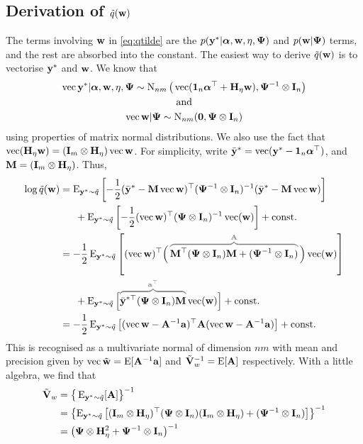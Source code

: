 \subsection{Derivation of \texorpdfstring{$\tilde q({\mathbf w})$}{$\tilde q(w)$}}
\label{apx:qw}

The terms involving ${\mathbf w}$ in \cref{eq:qtilde} are the $p({\mathbf y}^*|{\bm\alpha},{\mathbf w},\eta,{\bm\Psi})$ and $p({\mathbf w}|{\bm\Psi})$ terms, and the rest are absorbed into the constant.
The easiest way to derive $\tilde q({\mathbf w})$ is to vectorise ${\mathbf y}^*$ and ${\mathbf w}$.
We know that
\begin{gather*}
  \operatorname{vec} {\mathbf y}^* |  {\bm\alpha},{\mathbf w},\eta,{\bm\Psi} \sim \operatorname{N}_{nm}\big(\operatorname{vec} ({\mathbf 1}_n{\bm\alpha}^\top + {\mathbf H}_\eta{\mathbf w}), {\bm\Psi}^{-1}\otimes{\mathbf I}_n\big) \\
  \text{and}\\
  \operatorname{vec} {\mathbf w} | {\bm\Psi} \sim \operatorname{N}_{nm} ({\mathbf 0}, {\bm\Psi}\otimes{\mathbf I}_n)
\end{gather*}
using properties of matrix normal distributions.
We also use the fact that $\operatorname{vec} ({\mathbf H}_\eta{\mathbf w}) = ({\mathbf I}_m \otimes {\mathbf H}_\eta)\operatorname{vec}{\mathbf w}$.  %
For simplicity, write $\bar{{\mathbf y}}^* = \operatorname{vec}({\mathbf y}^* - {\mathbf 1}_n{\bm\alpha}^\top)$, and ${\mathbf M} = ({\mathbf I}_m \otimes {\mathbf H}_\eta)$.
Thus,
\begin{align*}
  \log \tilde q(\bw) 
  &= \E_{\by^*\sim \tilde q} \left[ 
  -\half (\bar\by^* - \bM\vecc\bw )^\top(\bPsi^{-1} \otimes \bI_n)^{-1} (\bar\by^* - \bM\vecc\bw )
  \right] \\
  &\phantom{==} + \E_{\by^*\sim \tilde q} \left[ 
  -\half (\vecc \bw )^\top(\bPsi \otimes \bI_n)^{-1} \vecc (\bw ) \right] + \const \\
  &= -\half\E_{\by^*\sim \tilde q} \left[ 
  (\vecc\bw)^\top \Big( \,
  \myoverbrace{\bM^\top(\bPsi \otimes \bI_n)\bM + (\bPsi^{-1} \otimes \bI_n)}{\bA} 
  \, \Big) \vecc (\bw )
  \right] \\
  &\phantom{==} + \E_{\by^*\sim \tilde q} \Big[ 
  \myoverbrace{\bar\by^{*\top} (\bPsi \otimes \bI_n) \bM}{\ba^\top} \vecc (\bw )
  \Big] + \const \\
  &= -\half\E_{\by^*\sim \tilde q} \left[
  (\vecc\bw - \bA^{-1}\ba)^\top \bA (\vecc\bw - \bA^{-1}\ba)
  \right] + \const
\end{align*}
This is recognised as a multivariate normal of dimension $nm$ with mean and precision given by $\operatorname{vec} \tilde{{\mathbf w}} = \operatorname{E}[{\mathbf A}^{-1}{\mathbf a}]$ and $\tilde{{\mathbf V}}_w ^{-1}= \operatorname{E}[{\mathbf A}]$ respectively.
With a little algebra, we find that
\begin{align*}
  \tilde{{\mathbf V}}_w 
  &= \big\{ \operatorname{E}_{{\mathbf y}^*\sim \tilde q} [{\mathbf A}] \big\}^{-1} \\
  &= \left\{ \operatorname{E}_{{\mathbf y}^*\sim \tilde q} \left[({\mathbf I}_m \otimes {\mathbf H}_\eta)^\top({\bm\Psi} \otimes {\mathbf I}_n)({\mathbf I}_m \otimes {\mathbf H}_\eta) + ({\bm\Psi}^{-1} \otimes {\mathbf I}_n) \right] \right\}^{-1} \\
  &= \big( {\bm\Psi} \otimes {\mathbf H}_\eta^2 + {\bm\Psi}^{-1} \otimes {\mathbf I}_n \big)^{-1}
\end{align*}
